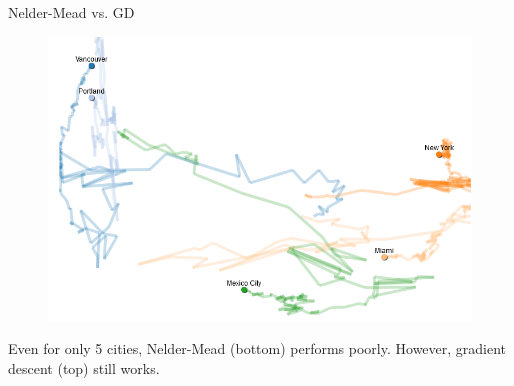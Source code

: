\documentclass[11pt,compress,t,notes=noshow, xcolor=table]{beamer}
\begin{document}
\begin{vbframe}{Nelder-Mead vs. GD}
\begin{figure}
\begin{minipage}{0.45\textwidth}
    \end{minipage}\hfill
    \begin{minipage}{0.45\textwidth}
        \centering
        \includegraphics[width = 0.8\linewidth]{figure_man/nm_gd_cities_8.PNG}
    \end{minipage}
\end{figure}
\vspace*{0.5cm}
\begin{footnotesize}
    Even for only 5 cities, Nelder-Mead (bottom) performs poorly.
    However, gradient descent (top) still works.
\end{footnotesize}

\end{vbframe}




\end{document}
